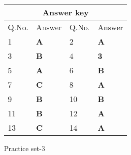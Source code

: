 \setlength\arrayrulewidth{1pt}
\begin{table}[H]
	\centering
	\begin{tabular}{|p{1.5cm}|p{1.5cm}||p{1.5cm}|p{1.5cm}|}
		\hline
		\multicolumn{4}{|c|}{\textbf{Answer key}}\\\hline\hline
		\rowcolor{ocrel}Q.No.&Answer&Q.No.&Answer\\\hline
		1&\textbf{A} &2&\textbf{A}\\\hline 
		3&\textbf{B} &4&\textbf{3} \\\hline
		5&\textbf{A} &6&\textbf{B} \\\hline
		7&\textbf{C}&8&\textbf{A}\\\hline
		9&\textbf{B}&10&\textbf{B}\\\hline
		11&\textbf{B} &12&\textbf{A}\\\hline
		13&\textbf{C}&14&\textbf{A}\\\hline
	\end{tabular}
\end{table}
\newpage
\begin{abox}
	Practice set-3
\end{abox}
